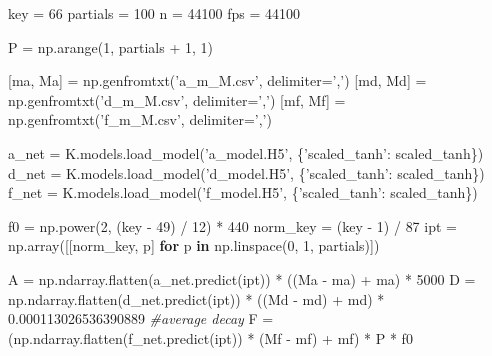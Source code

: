 \documentclass[]{article}
\newenvironment{Shaded}{}{}
\newcommand{\CommentTok}[1]{\textcolor[rgb]{0.38,0.63,0.69}{\textit{#1}}}
\newcommand{\ControlFlowTok}[1]{\textcolor[rgb]{0.00,0.44,0.13}{\textbf{#1}}}
\newcommand{\DecValTok}[1]{\textcolor[rgb]{0.25,0.63,0.44}{#1}}
\newcommand{\FloatTok}[1]{\textcolor[rgb]{0.25,0.63,0.44}{#1}}
\newcommand{\KeywordTok}[1]{\textcolor[rgb]{0.00,0.44,0.13}{\textbf{#1}}}
\newcommand{\NormalTok}[1]{#1}
\newcommand{\OperatorTok}[1]{\textcolor[rgb]{0.40,0.40,0.40}{#1}}
\newcommand{\StringTok}[1]{\textcolor[rgb]{0.25,0.44,0.63}{#1}}
\begin{document}
\begin{Shaded}
\begin{Highlighting}[numbers=left,,]
\NormalTok{key }\OperatorTok{=} \DecValTok{66}
\NormalTok{partials }\OperatorTok{=} \DecValTok{100}
\NormalTok{n }\OperatorTok{=} \DecValTok{44100}
\NormalTok{fps }\OperatorTok{=} \DecValTok{44100}

\NormalTok{P }\OperatorTok{=}\NormalTok{ np.arange(}\DecValTok{1}\NormalTok{, partials }\OperatorTok{+} \DecValTok{1}\NormalTok{, }\DecValTok{1}\NormalTok{)}

\NormalTok{[ma, Ma] }\OperatorTok{=}\NormalTok{ np.genfromtxt(}\StringTok{'a_m_M.csv'}\NormalTok{, delimiter}\OperatorTok{=}\StringTok{','}\NormalTok{)}
\NormalTok{[md, Md] }\OperatorTok{=}\NormalTok{ np.genfromtxt(}\StringTok{'d_m_M.csv'}\NormalTok{, delimiter}\OperatorTok{=}\StringTok{','}\NormalTok{)}
\NormalTok{[mf, Mf] }\OperatorTok{=}\NormalTok{ np.genfromtxt(}\StringTok{'f_m_M.csv'}\NormalTok{, delimiter}\OperatorTok{=}\StringTok{','}\NormalTok{)}

\NormalTok{a_net }\OperatorTok{=}\NormalTok{ K.models.load_model(}\StringTok{'a_model.H5'}\NormalTok{, \{}\StringTok{'scaled_tanh'}\NormalTok{: scaled_tanh\})}
\NormalTok{d_net }\OperatorTok{=}\NormalTok{ K.models.load_model(}\StringTok{'d_model.H5'}\NormalTok{, \{}\StringTok{'scaled_tanh'}\NormalTok{: scaled_tanh\})}
\NormalTok{f_net }\OperatorTok{=}\NormalTok{ K.models.load_model(}\StringTok{'f_model.H5'}\NormalTok{, \{}\StringTok{'scaled_tanh'}\NormalTok{: scaled_tanh\})}

\NormalTok{f0 }\OperatorTok{=}\NormalTok{ np.power(}\DecValTok{2}\NormalTok{, (key }\OperatorTok{-} \DecValTok{49}\NormalTok{) }\OperatorTok{/} \DecValTok{12}\NormalTok{) }\OperatorTok{*} \DecValTok{440}
\NormalTok{norm_key }\OperatorTok{=}\NormalTok{ (key }\OperatorTok{-} \DecValTok{1}\NormalTok{) }\OperatorTok{/} \DecValTok{87}
\NormalTok{ipt }\OperatorTok{=}\NormalTok{ np.array([[norm_key, p] }\ControlFlowTok{for}\NormalTok{ p }\KeywordTok{in}\NormalTok{ np.linspace(}\DecValTok{0}\NormalTok{, }\DecValTok{1}\NormalTok{, partials)])}

\NormalTok{A }\OperatorTok{=}\NormalTok{ np.ndarray.flatten(a_net.predict(ipt)) }\OperatorTok{*}\NormalTok{ ((Ma }\OperatorTok{-}\NormalTok{ ma) }\OperatorTok{+}\NormalTok{ ma) }\OperatorTok{*} \DecValTok{5000}
\NormalTok{D }\OperatorTok{=}\NormalTok{ np.ndarray.flatten(d_net.predict(ipt)) }\OperatorTok{*}\NormalTok{ ((Md }\OperatorTok{-}\NormalTok{ md) }\OperatorTok{+}\NormalTok{ md) }\OperatorTok{*} \FloatTok{0.000113026536390889} \CommentTok{#average decay}
\NormalTok{F }\OperatorTok{=}\NormalTok{ (np.ndarray.flatten(f_net.predict(ipt)) }\OperatorTok{*}\NormalTok{ (Mf }\OperatorTok{-}\NormalTok{ mf) }\OperatorTok{+}\NormalTok{ mf) }\OperatorTok{*}\NormalTok{ P }\OperatorTok{*}\NormalTok{ f0}


\end{Highlighting}
\end{Shaded}
\end{document}
